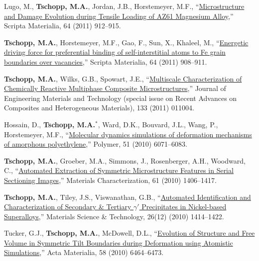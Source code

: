 \begin{cvlist}
\item
{Lugo, M.}, \textbf{Tschopp, M.A.}, Jordan, J.B., Horstemeyer, M.F., ``\href{http://dx.DOI.org/10.1016/j.scriptamat.2011.01.029}{Microstructure and Damage Evolution during Tensile Loading of AZ61 Magnesium Alloy},'' Scripta Materialia, 64 (2011) 912--915.

\item
\textbf{Tschopp, M.A.}, Horstemeyer, M.F., Gao, F., Sun, X., Khaleel, M., ``\href{http://dx.DOI.org/10.1016/j.scriptamat.2011.01.031}{Energetic driving force for preferential binding of self-interstitial atoms to Fe grain boundaries over vacancies},'' Scripta Materialia, 64 (2011) 908--911.

\item
\textbf{Tschopp, M.A.}, Wilks, G.B., Spowart, J.E., ``\href{http://dx.DOI.org/10.1115/1.4002639}{Multiscale Characterization of Chemically Reactive Multiphase Composite Microstructures},'' Journal of Engineering Materials and Technology (special issue on Recent Advances on Composites and Heterogeneous Materials), 133 (2011) 011004. 

\item
{Hossain, D.}, \textbf{Tschopp, M.A.}$^\ast$, Ward, D.K., Bouvard, J.L., Wang, P., Horstemeyer, M.F., ``\href{http://dx.DOI.org/10.1016/j.polymer.2010.10.009}{Molecular dynamics simulations of deformation mechanisms of amorphous polyethylene},'' Polymer, 51 (2010) 6071--6083.

\item
\textbf{Tschopp, M.A.}, Groeber, M.A., Simmons, J., Rosenberger, A.H., Woodward, C., ``\href{http://dx.DOI.org/10.1016/j.matchar.2010.10.008}{Automated Extraction of Symmetric Microstructure Features in Serial Sectioning Images},'' Materials Characterization, 61 (2010) 1406--1417.

\item 
\textbf{Tschopp, M.A.}, Tiley, J.S., Viswanathan, G.B., ``\href{http://dx.DOI.org/10.1179/026708309X12560332736638}{Automated Identification and Characterization of Secondary \& Tertiary $\gamma\prime$ Precipitates in Nickel-based Superalloys},'' Materials Science \& Technology, 26(12) (2010) 1414--1422.  

\item 
Tucker, G.J., \textbf{Tschopp, M.A.}, McDowell, D.L., ``\href{http://dx.DOI.org/10.1016/j.actamat.2010.08.008}{Evolution of Structure and Free Volume in Symmetric Tilt Boundaries during Deformation using Atomistic Simulations},'' Acta Materialia, 58 (2010) 6464--6473.


\end{cvlist}
